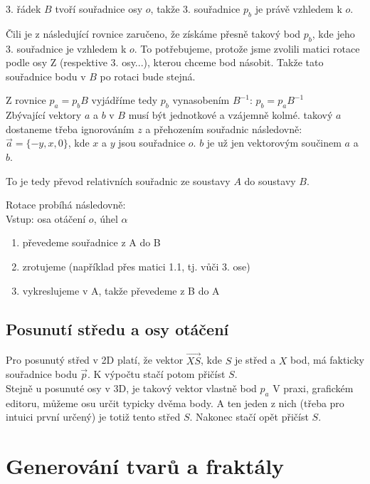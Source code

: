 \documentclass[a4paper,12pt]{book}
\begin{document}
3. řádek $B$ tvoří souřadnice osy $o$, takže 3. souřadnice $p_b$ je právě vzhledem k $o$.

Čili je z následující rovnice zaručeno, že získáme přesně takový bod $p_b$, kde jeho 3. souřadnice je vzhledem k $o$. To potřebujeme, protože jsme zvolili matici
rotace podle osy Z (respektive 3. osy...), kterou chceme bod násobit. Takže tato souřadnice bodu v $B$ po rotaci bude stejná.

Z rovnice $p_a = p_b B$ vyjádříme tedy $p_b$ vynasobením $B^{-1}$: $p_b = p_a B^{-1}$\\ %


Zbývající vektory $a$ a $b$ v $B$ musí být jednotkové a vzájemně kolmé. takový $a$ dostaneme třeba ignorováním $z$ a přehozením souřadnic následovně: $\vec{a} = \{-y, x, 0\}$, kde $x$ a $y$ jsou souřadnice $o$. $b$ je už jen vektorovým součinem $a$ a $b$.

To je tedy převod relativních souřadnic ze soustavy $A$ do soustavy $B$.




Rotace probíhá následovně:\\

Vstup: osa otáčení $o$, úhel $\alpha$

\begin{enumerate}[label=\arabic*, font=\bfseries] %
	\item převedeme souřadnice z A do B
	\item zrotujeme (například přes matici 1.1, tj. vůči 3. ose)
	\item vykreslujeme v A, takže převedeme z B do A
\end{enumerate}



\section{Posunutí středu a osy otáčení}

Pro posunutý střed v 2D platí, že vektor $\vec{XS}$, kde $S$ je střed a $X$ bod, má fakticky souřadnice bodu $\vec{p}$. K výpočtu stačí potom přičíst $S$.\\

Stejně u posunuté osy v 3D, je takový vektor vlastně bod $p_a$
V praxi, grafickém editoru, můžeme osu určit typicky dvěma body. A ten jeden z nich (třeba pro intuici první určený) je totiž tento střed $S$. Nakonec stačí opět přičíst $S$.


\chapter{Generování tvarů a fraktály}
\end{document}
